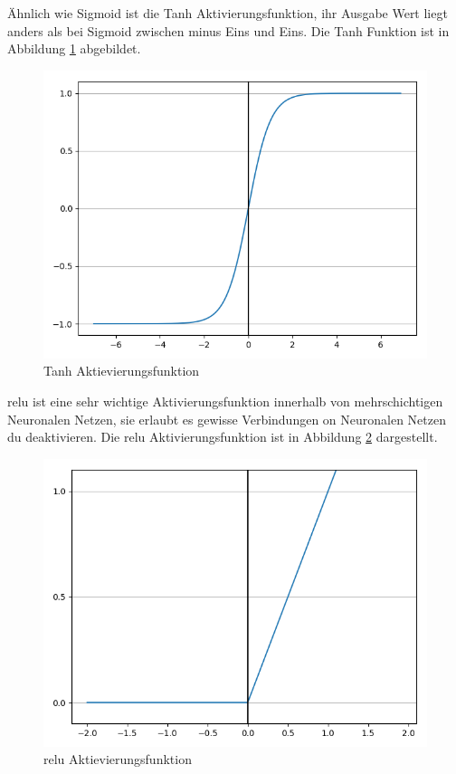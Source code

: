 \documentclass[conference, german]{IEEEtran}
\begin{document}
Ähnlich wie Sigmoid ist die Tanh Aktivierungsfunktion, ihr Ausgabe Wert liegt anders als bei Sigmoid zwischen minus Eins und Eins.
Die Tanh Funktion ist in Abbildung \ref{fig:tanh} abgebildet.

\begin{figure}[H]
	\includegraphics[width=\linewidth]{plots/tanh.png}
	\caption{Tanh Aktievierungsfunktion}
	\label{fig:tanh}
\end{figure}

\ac{relu} ist eine sehr wichtige Aktivierungsfunktion innerhalb von mehrschichtigen Neuronalen Netzen, sie erlaubt es gewisse Verbindungen on Neuronalen Netzen du deaktivieren. Die \ac{relu} Aktivierungsfunktion ist in Abbildung \ref{fig:relu} dargestellt.

\begin{figure}[H]
	\includegraphics[width=\linewidth]{plots/relu.png}
	\caption{\ac{relu} Aktievierungsfunktion}
	\label{fig:relu}
\end{figure}
\end{document}

